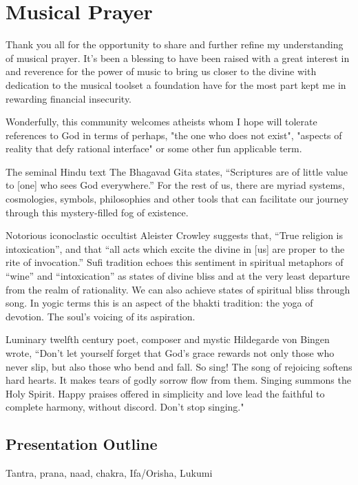 \documentclass[12pt]{article}
\begin{document}
\section*{Musical Prayer}

Thank you all for  the opportunity to share and further refine my understanding of musical prayer. It's been a blessing to have been raised with a great interest in and reverence for the power of music to bring us closer to the divine with dedication to the musical toolset a foundation have for the most part kept me in rewarding financial insecurity.

Wonderfully, this community welcomes atheists whom I hope will tolerate references to God in terms of perhaps, "the one who does not exist", "aspects of reality that defy rational interface" or some other fun applicable term.

The seminal Hindu text The Bhagavad Gita states, “Scriptures are of little value to [one] who sees God everywhere.” For the rest of us, there are myriad systems, cosmologies, symbols, philosophies and other tools that can facilitate our journey through this mystery-filled fog of existence.

Notorious iconoclastic occultist Aleister Crowley suggests that, “True religion is intoxication”, and that “all acts which excite the divine in [us] are proper to the rite of invocation.” Sufi tradition echoes this sentiment in spiritual metaphors of “wine” and “intoxication” as states of divine bliss and at the very least departure from the realm of rationality. We can also achieve states of spiritual bliss through song. In yogic terms this is an aspect of the bhakti tradition: the yoga of devotion. The soul’s voicing of its aspiration.

Luminary twelfth century poet, composer and mystic Hildegarde von Bingen wrote, “Don't let yourself forget that God's grace rewards not only those who never slip, but also those who bend and fall. So sing! The song of rejoicing softens hard hearts. It makes tears of godly sorrow flow from them. Singing summons the Holy Spirit. Happy praises offered in simplicity and love lead the faithful to complete harmony, without discord. Don't stop singing."

\subsection*{Presentation Outline}

Tantra, prana, naad, chakra, Ifa/Orisha, Lukumi
\end{document}
